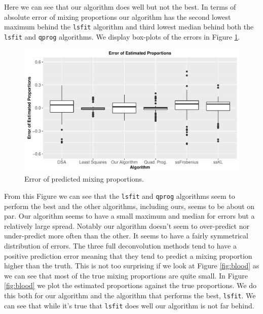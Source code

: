 \documentclass[reqno,12pt,oneside]{report}\usepackage[]{graphicx}\usepackage[]{color}
\makeatletter
\def\maxwidth{ %
  \ifdim\Gin@nat@width>\linewidth
    \linewidth
  \else
    \Gin@nat@width
  \fi
}
\newenvironment{knitrout}{}{} %
\renewenvironment{knitrout}{\begin{small}}{\end{small}}
\theoremstyle{plain}
\theoremstyle{definition}
\theoremstyle{remark}
\numberwithin{theorem}{chapter}     %
\makeatother
\begin{document}
Here we can see that our algorithm does well but not the best. In terms of absolute error of mixing proportions our algorithm has the second lowest maximum behind the \verb+lsfit+ algorithm and third lowest median behind both the \verb+lsfit+ and \verb+qprog+ algorithms. We display box-plots of the errors in Figure \ref{fig:bloodbox}.

\begin{figure}[ht]
  \centering
\begin{knitrout}
\color{fgcolor}
\includegraphics[width=\maxwidth]{figure/plot4-1} 

\end{knitrout}
\caption{Error of predicted mixing proportions.}
\label{fig:bloodbox}
\end{figure}

From this Figure we can see that the \verb+lsfit+ and \verb+qprog+ algorithms seem to perform the best and the other algorithms, including ours, seems to be about on par. Our algorithm seems to have a small maximum and median for errors but a relatively large spread.  Notably our algorithm doesn't seem to over-predict nor under-predict more often than the other. It seems to have a fairly symmetrical distribution of errors. The three full deconvolution methods tend to have a positive prediction error meaning that they tend to predict a mixing proportion higher than the truth. This is not too surprising if we look at Figure \ref{fig:blood} as we can see that most of the true mixing proportions are quite small. In Figure \ref{fig:blood} we plot the estimated proportions against the true proportions. We do this both for our algorithm and the algorithm that performs the best, \verb+lsfit+. We can see that while it's true that \verb+lsfit+ does well our algorithm is not far behind. 
\end{document}

